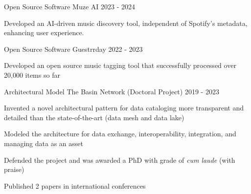 

\begin{cventries}


  \cventry
    {Open Source Software} %
    {Muze AI} %
    {} %
    {2023 - 2024} %
    {
          \begin{cvitems} %
	        \item {Developed an AI-driven music discovery tool, independent of Spotify's metadata, enhancing user experience.}
	      \end{cvitems}
    }



  \cventry
    {Open Source Software} %
    {Guestrrday} %
    {} %
    {2022 - 2023} %
    {
          \begin{cvitems} %
	        \item {Developed an open source music tagging tool that successfully processed over 20,000 items so far}
	      \end{cvitems}
    }




  \cventry
    {Architectural Model} %
    {The Basin Network (Doctoral Project)} %
    {} %
    {2019 - 2023} %
    {
          \begin{cvitems} %
			\item {Invented a novel architectural pattern for data cataloging more transparent and detailed than the state-of-the-art (data mesh and data lake)}
			\item {Modeled the architecture for data exchange, interoperability, integration, and managing data as an asset}
			\item {Defended the project and was awarded a PhD with grade of \emph{cum laude} (with praise)}
			\item {Published 2 papers in international conferences}
	      \end{cvitems}
    }



\end{cventries}
